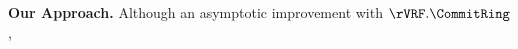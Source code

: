 %
%
%
%
%
%
\\\\
\noindent \textbf{Our Approach.} Although an asymptotic improvement with $ \rVRF.\CommitRing $, 
